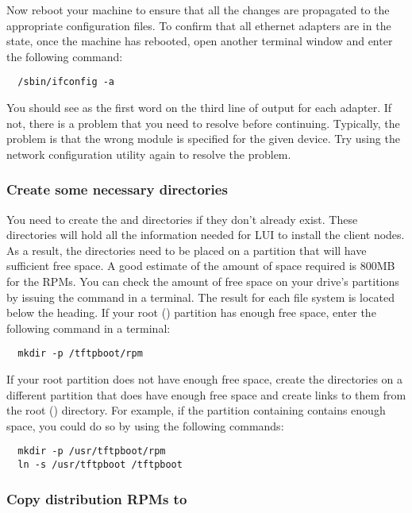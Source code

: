Now reboot your machine to ensure that all the changes are propagated
to the appropriate configuration files. To confirm that all ethernet
adapters are in the  state, once the machine has rebooted,
open another terminal window and enter the following command:

\begin{verbatim}
  /sbin/ifconfig -a
\end{verbatim}
  
You should see  as the first word on the third line of output
for each adapter. If not, there is a problem that you need to resolve
before continuing. Typically, the problem is that the wrong module is
specified for the given device. Try using the network configuration
utility again to resolve the problem.
  
\subsubsection{Create some necessary directories} 

You need to create the  and 
directories if they don't already exist. These directories will hold
all the information needed for LUI to install the client nodes. As a
result, the directories need to be placed on a partition that will
have sufficient free space. 
\begchange
A good estimate of the amount of space
required is 800MB for the RPMs.
\endchange
You can check
the amount of free space on your drive's partitions by issuing the
command  in a terminal.  The result for each file system is
located below the  heading. If your root (\file{/})
partition has enough free space, enter the following command in a
terminal:

\begin{verbatim}
  mkdir -p /tftpboot/rpm
\end{verbatim}
  
If your root partition does not have enough free space, create the
directories on a different partition that does have enough free space
and create links to them from the root (\file{/}) directory.  For
example, if the partition containing  contains enough
space, you could do so by using the following commands:

\begin{verbatim}
  mkdir -p /usr/tftpboot/rpm
  ln -s /usr/tftpboot /tftpboot
\end{verbatim}
  
\subsubsection{Copy distribution RPMs to }

